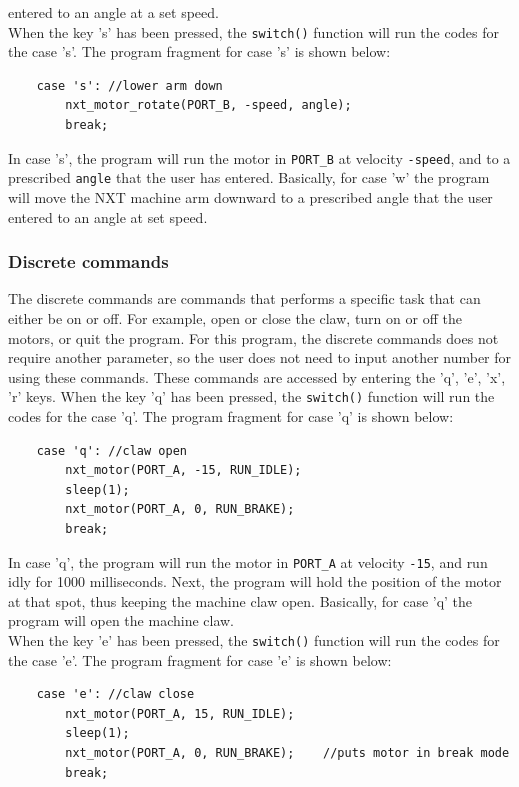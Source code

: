 \documentclass[12pt]{article}
\begin{document}
    entered to an angle at a set speed.
\\
When the key 's' has been pressed, the \verb+switch()+ function will run the codes for the case 's'.
The program fragment for case 's' is shown below:
\begin{verbatim} 
    case 's': //lower arm down
        nxt_motor_rotate(PORT_B, -speed, angle);
        break;
\end{verbatim}
In case 's', the program will run the motor in \verb+PORT_B+ at velocity \verb+-speed+, and to a prescribed
    \verb+angle+ that the user has entered.
Basically, for case 'w' the program will move the NXT machine arm downward to a prescribed angle that the user
    entered to an angle at set speed.
\\
\subsubsection*{Discrete commands}
The discrete commands are commands that performs a specific task that can either be on or off.
For example, open or close the claw, turn on or off the motors, or quit the program.
For this program, the discrete commands does not require another parameter, so the user does not need to
    input another number for using these commands.
These commands are accessed by entering the 'q', 'e', 'x', 'r' keys.
\newline
When the key 'q' has been pressed, the \verb+switch()+ function will run the codes for the case 'q'.
The program fragment for case 'q' is shown below:
\begin{verbatim} 
    case 'q': //claw open
        nxt_motor(PORT_A, -15, RUN_IDLE);
        sleep(1);
        nxt_motor(PORT_A, 0, RUN_BRAKE);
        break;
\end{verbatim}
In case 'q', the program will run the motor in \verb+PORT_A+ at velocity \verb+-15+, and run idly for 1000
    milliseconds.
Next, the program will hold the position of the motor at that spot, thus keeping the machine claw open.
Basically, for case 'q' the program will open the machine claw.
\\
When the key 'e' has been pressed, the \verb+switch()+ function will run the codes for the case 'e'.
The program fragment for case 'e' is shown below:
\begin{verbatim} 
    case 'e': //claw close
        nxt_motor(PORT_A, 15, RUN_IDLE);
        sleep(1);
        nxt_motor(PORT_A, 0, RUN_BRAKE);	//puts motor in break mode
        break;
\end{verbatim}
\end{document}

